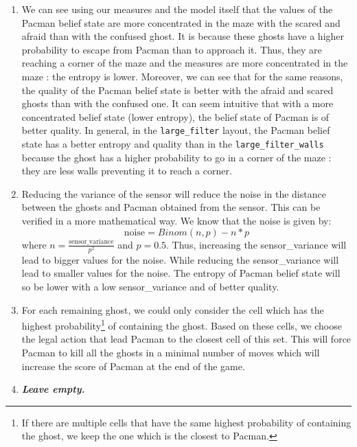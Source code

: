 \documentclass{article}
\begin{document}
\begin{enumerate}[label=\alph*.,leftmargin=*]
    \item We can see using our measures and the model itself that the values of the Pacman belief state are more concentrated in the maze with the scared and afraid than with the confused ghost. It is because these ghosts have a higher probability to escape from Pacman than to approach it. Thus, they are reaching a corner of the maze and the measures are more concentrated in the maze : the entropy is lower.
    Moreover, we can see that for the same reasons, the quality of the Pacman belief state is better with the afraid and scared ghosts than with the confused one. It can seem intuitive that with a more concentrated belief state (lower entropy), the belief state of Pacman is of better quality. In general, in the \texttt{large\_filter} layout, the Pacman belief state has a better entropy and quality than in the \texttt{large\_filter\_walls} because the ghost has a higher probability to go in a corner of the maze : they are less walls preventing it to reach a corner.
    \item Reducing the variance of the sensor will reduce the noise in the distance between the ghosts and Pacman obtained from the sensor. This can be verified in a more mathematical way. We know that the noise is given by: $$\text{noise} = Binom(n, p) - n * p$$
    where $n = \frac{\text{sensor\_variance}}{p^2}$ and $p = 0.5$. Thus, increasing the sensor\_variance will lead to bigger values for the noise. While reducing the sensor\_variance will lead to smaller values for the noise. The entropy of Pacman belief state will so be lower with a low sensor\_variance and of better quality.
    
    \item For each remaining ghost, we could only consider the cell which has the highest probability\footnote{If there are multiple cells that have the same highest probability of containing the ghost, we keep the one which is the closest to Pacman.} of containing the ghost. Based on these cells, we choose the legal action that lead Pacman to the closest cell of this set. This will force Pacman to kill all the ghosts in a minimal number of moves which will increase the score of Pacman at the end of the game.
    \item \textbf{\textit{Leave empty.}}
\end{enumerate}

\end{document}
